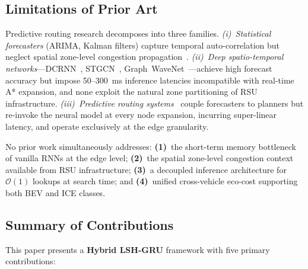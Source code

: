 \documentclass[journal,letterpaper,10pt]{IEEEtran}
\theoremstyle{definition}
\theoremstyle{remark}
\newcommand{\bigO}[1]{\mathcal{O}\!\left(#1\right)}
\begin{document}
\subsection{Limitations of Prior Art}

Predictive routing research decomposes into three families.
\textit{(i)~Statistical forecasters} (ARIMA, Kalman filters) capture
temporal auto-correlation but neglect spatial zone-level congestion
propagation~\cite{ahmed1979analysis}.
\textit{(ii)~Deep spatio-temporal networks}---DCRNN~\cite{li2018diffusion},
STGCN~\cite{yu2018stgcn}, Graph~WaveNet~\cite{wu2019gwn}---achieve
high forecast accuracy but impose 50--300~ms inference latencies
incompatible with real-time A* expansion, and none exploit the
natural zone partitioning of RSU infrastructure.
\textit{(iii)~Predictive routing systems}~\cite{guo2019deep,sun2015velocity}
couple forecasters to planners but re-invoke the neural model at
every node expansion, incurring super-linear latency, and operate
exclusively at the edge granularity.

No prior work simultaneously addresses: \textbf{(1)}~the short-term
memory bottleneck of vanilla RNNs at the edge level; \textbf{(2)}~the
spatial zone-level congestion context available from RSU
infrastructure; \textbf{(3)}~a decoupled inference architecture for
$\bigO{1}$ lookups at search time; and \textbf{(4)}~unified
cross-vehicle eco-cost supporting both BEV and ICE classes.

\subsection{Summary of Contributions}

This paper presents a \textbf{Hybrid LSH-GRU} framework with five
primary contributions:
\end{document}
